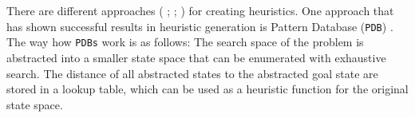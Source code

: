 There are different approaches (\citeauthor{haslum2007domain} \citeyear{haslum2007domain}; \citeauthor{edelkamp2007automated} \citeyear{edelkamp2007automated}; \citeauthor{nissim2011computing} \citeyear{nissim2011computing}) for creating heuristics. %
One approach that has shown successful results in heuristic generation is Pattern Database (\texttt{PDB}) \cite{culberson1998pattern}. The way how \texttt{PDBs} work is as follows: The search space of the problem is abstracted into a smaller state space that can be enumerated with exhaustive search. The distance of all abstracted states to the abstracted goal state are stored in a lookup table, which can be used as a heuristic function for the original state space.



